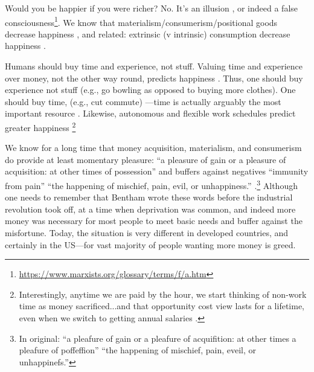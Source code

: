 \documentclass[10pt, letterpaper]{article}
\begin{document}
\begin{spacing}{1.8}
Would you be happier if you were richer? No. It's an illusion \citep{kahneman06c}, or indeed
a false consciousness\footnote{\url{https://www.marxists.org/glossary/terms/f/a.htm}}.
We know that materialism/consumerism/positional goods decrease happiness 
\cite{kasser16,dittmar14,brown05,kasser13,schmuck00,kasser93,leonard10}, and
related: 
extrinsic (v intrinsic) consumption decrease happiness 
\citep{ryan00,ryan99,morrison17}.

Humans should buy time and experience, not stuff. 
Valuing time and experience over money, not the other way round, predicts happiness \citep{whillans2019valuing}.
Thus, one should buy experience not stuff (e.g., go bowling as opposed to buying more clothes)\citep{putnam01,kasser16,dittmar14}. One should buy time, (e.g., cut commute)  %
---time is actually arguably the most important resource \citep{whillans17}. Likewise, autonomous and flexible work schedules predict greater happiness \citep{gssLonnie18,aokLead17,farber16sep15,golden06w,golden13}\footnote{Interestingly, anytime we are paid by the hour, we start thinking of non-work time as money sacrificed...and that opportunity cost view lasts for a lifetime, even when we switch to getting annual salaries \citep{devoe19}.}







We know for a long time that money acquisition, materialism, and consumerism do provide at least momentary pleasure: ``a pleasure of gain or a pleasure of
acquisition: at other times of possession'' and buffers against negatives
``immunity from pain'' ``the happening of mischief, pain, evil, or
unhappiness.'' \citep[Bentham cited in ]{cummins2019jeremy}.\footnote{In original: ``a pleafure of gain or a pleafure of acquifition: at other times a pleafure of poffeffion'' ``the happening of mischief, pain, eveil, or unhappinefs.''}
Although one needs to remember that Bentham wrote these words before the industrial revolution took off, at a time when deprivation was common, and
indeed more money was necessary for most people to meet basic needs and buffer
against the misfortune. Today, the situation is very different in developed
countries, and certainly in the US---for vast majority of people wanting more money is greed. 



\end{spacing}
\end{document}
